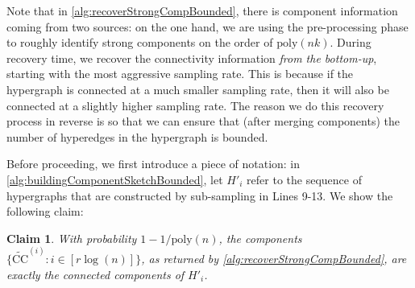 \documentclass[11pt]{article}
\newtheorem{claim}[theorem]{Claim}
\theoremstyle{definition}
\begin{document}
Note that in \cref{alg:recoverStrongCompBounded}, there is component information coming from two sources: on the one hand, we are using the pre-processing phase to roughly identify strong components on the order of $\mathrm{poly}(nk)$. During recovery time, we recover the connectivity information \emph{from the bottom-up}, starting with the most aggressive sampling rate. This is because if the hypergraph is connected at a much smaller sampling rate, then it will also be connected at a slightly higher sampling rate. The reason we do this recovery process in reverse is so that we can ensure that (after merging components) the number of hyperedges in the hypergraph is bounded. 

Before proceeding, we first introduce a piece of notation: in \cref{alg:buildingComponentSketchBounded}, let $H'_i$ refer to the sequence of hypergraphs that are constructed by sub-sampling in Lines 9-13. We show the following claim:

\begin{claim}\label{clm:componentRecovery}
	With probability $1 - 1  / \mathrm{poly}(n)$, the components $\{\widetilde{\mathrm{CC}}^{(i)}: i \in [r \log(n)]\}$, as returned by \cref{alg:recoverStrongCompBounded}, are exactly the connected components of $H'_i$.
\end{claim}
\end{document}

